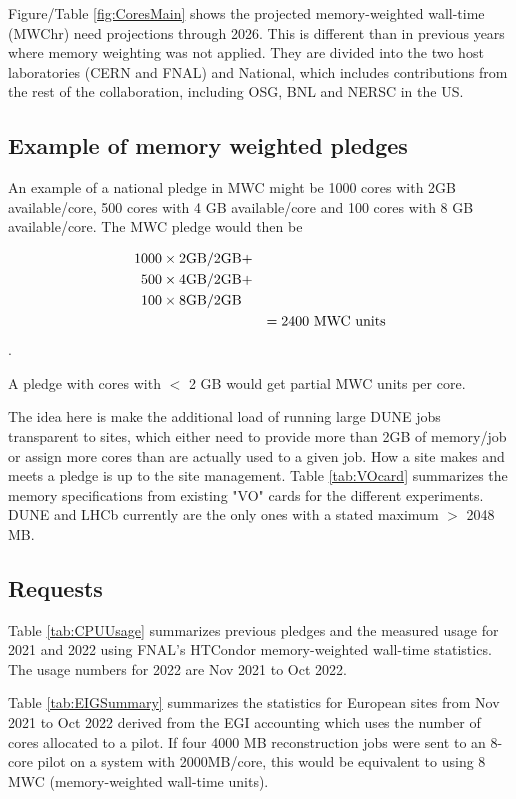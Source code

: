 \documentclass[12pt]{article}
\begin{document}
Figure/Table \ref{fig:CoresMain} shows the projected memory-weighted wall-time  (MWChr) need projections through 2026.  This is different than in previous years where memory weighting was not applied.   They are divided into the two host laboratories (CERN and FNAL) and National, which includes contributions from the rest of the collaboration, including OSG, BNL and NERSC in the US. 


\subsection{Example of memory weighted pledges}
An example of a  national pledge in MWC might be  1000 cores with 2GB available/core, 500 cores with 4 GB available/core and 100 cores with 8 GB available/core.  The MWC pledge would then be 

\newcommand{\GB}{\hbox{GB}}

\begin{eqnarray*} 1000\times2\GB/2\GB &+& \\ 500\times4\GB/2\GB &+&\\100\times8\GB/2\GB\\&&= 2400 \hbox{\ MWC units}\end{eqnarray*}.

A pledge with cores with $<$ 2 GB would get partial MWC units per core. 

The idea here is make the additional load of running large DUNE jobs transparent to sites, which either need to provide more than 2GB of memory/job or assign more cores than are actually used to a given job.  How a site makes and meets a pledge is up to the site management. Table \ref{tab:VOcard} summarizes the memory specifications from existing "VO" cards for the different experiments.  DUNE and LHCb currently are the only ones with a stated maximum $>$ 2048 MB.

\subsection{Requests}




Table \ref{tab:CPUUsage} summarizes previous pledges\cite{CCB2022} and the measured usage  for 2021 and 2022 using FNAL's  HTCondor memory-weighted wall-time statistics\cite{fifemonDUNE}.  The  usage numbers for 2022 are Nov 2021 to Oct 2022. 

Table \ref{tab:EIGSummary} summarizes the statistics for European sites from Nov 2021 to Oct 2022 derived from the EGI accounting\cite{EGI2022} which uses the number of cores allocated to a pilot.   If four 4000 MB reconstruction jobs were sent to an 8-core pilot on a system with 2000MB/core, this would be equivalent to using 8 MWC (memory-weighted wall-time units).   
\end{document}
